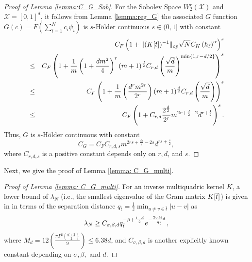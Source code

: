 \documentclass{article}
\numberwithin{equation}{section}
\begin{document}
\begin{appendices}
\begin{proof}[Proof of Lemma \ref{lemma:C_G_Sob}]
For the Sobolev Space $W^r_2(\mathcal{X})$ and $\mathcal{X}= [0,1]^d$, it follows from Lemma \ref{lemma:reg_G} the associated $G$ function  $G(c) = F\left(\sum_{i=1}^N c_i \psi_i\right)$ is $s$-H\"{o}lder continuous $s \in (0,1]$ with constant 
\begin{eqnarray*}
    & & C_F\left(1+ \|(K[\Bar{t}])^{-1 }\|_{op}\sqrt{N} C_K \left(h_{\Bar{t}}\right)^\alpha\right)^s\\
    &\leq& C_F\left(1+ \frac{1}{m}\left(1+ \frac{dm^2}{4}\right)^{r}(m+1)^{\frac{d}{2}}  C_{r,d} \left(\frac{\sqrt{d}}{m}\right)^{\min\{1,r-d/2\}}\right)^s\\
     &\leq& C_F\left(1+ \frac{1}{m}\left(\frac{d^rm^{2r}}{2^r}\right)(m+1)^{\frac{d}{2}}  C_{r,d} \left(\frac{\sqrt{d}}{m}\right)\right)^s\\
     &\leq& C_F\left(1+ C_{r,d}\frac{2^{\frac{d}{2}}}{2^r} m^{2r+\frac{d}{2}-2} d^{r+\frac{1}{2}} \right)^s. 
\end{eqnarray*}
Thus, $G$ is  $s$-H\"{o}lder continuous with constant
\begin{equation*}
    C_G =  C_F C_{r,d,s} m^{2rs+\frac{ds}{2}-2s} d^{rs+\frac{s}{2}}, 
\end{equation*}
where $C_{r,d,s}$ is a positive constant depends only on $r, d$, and $s$.
\end{proof}


Next, we give the proof of Lemma \ref{lemma: C_G_multi}.
\begin{proof}[Proof of Lemma \ref{lemma: C_G_multi}]
For an inverse multiquadric kernel $K$, a lower bound of $\lambda_N$  (i.e., the smallest eigenvalue of the Gram matrix $K[\Bar{t}]$)  is given in \citep[Lemma 8.2]{fasshauer2005meshfree} in terms of the separation distance $q_{\bar{t}}=\frac{1}{2} \min_{u \neq v \in\bar{t}} |u-v|$ as
\begin{equation}
    \lambda_N \geq C_{\sigma, \beta,d}q_{\Bar{t}}^{-\beta +\frac{1-d}{2}}e^{-\frac{2\sigma M_d}{q_{\Bar{t}}}},
\end{equation}
where $M_d = 12 \left(\frac{\pi \Gamma^2(\frac{d+2}{2})}{9}\right) \leq 6.38d$, and $C_{\sigma, \beta,d}$ is another explicitly known constant depending on $\sigma, \beta,$ and $d$.


\end{proof}
\end{appendices}
\end{document}
